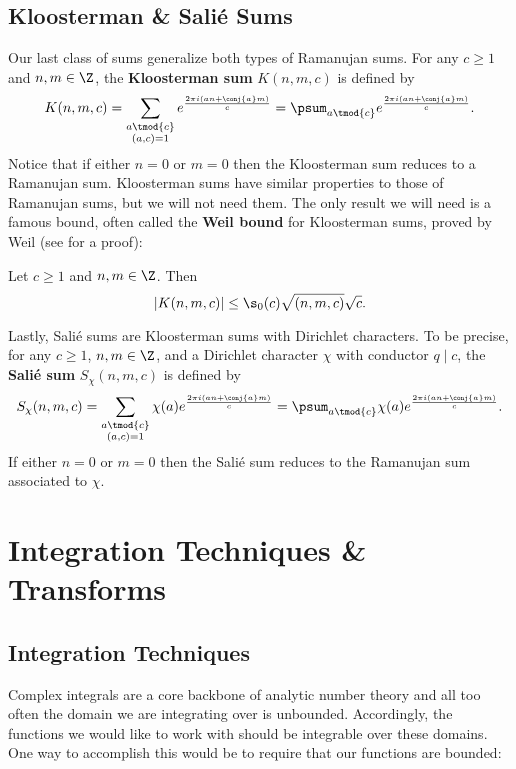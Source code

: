       \subsection*{Kloosterman \& Sali\'e Sums}
        Our last class of sums generalize both types of Ramanujan sums. For any $c \ge 1$ and $n,m \in \Z$, the \textbf{Kloosterman sum} $K(n,m,c)$ is defined by
        \[
          K(n,m,c) = \sum_{\substack{a \tmod{c} \\ (a,c) = 1}}e^{\frac{2\pi i(an+\conj{a}m)}{c}} = \psum_{a \tmod{c}}e^{\frac{2\pi i(an+\conj{a}m)}{c}}.
        \]
        Notice that if either $n = 0$ or $m = 0$ then the Kloosterman sum reduces to a Ramanujan sum. Kloosterman sums have similar properties to those of Ramanujan sums, but we will not need them. The only result we will need is a famous bound, often called the \textbf{Weil bound} for Kloosterman sums, proved by Weil (see \cite{weil1948some} for a proof):

        \begin{theorem}
          Let $c \ge 1$ and $n,m \in \Z$. Then
          \[
            |K(n,m,c)| \le \s_{0}(c)\sqrt{(n,m,c)}\sqrt{c}.
          \]
        \end{theorem}

        Lastly, Sali\'e sums are Kloosterman sums with Dirichlet characters. To be precise, for any $c \ge 1$, $n,m \in \Z$, and a Dirichlet character $\chi$ with conductor $q \mid c$, the \textbf{Sali\'e sum} $S_{\chi}(n,m,c)$ is defined by
        \[
          S_{\chi}(n,m,c) = \sum_{\substack{a \tmod{c} \\ (a,c) = 1}}\chi(a)e^{\frac{2\pi i(an+\conj{a}m)}{c}} = \psum_{a \tmod{c}}\chi(a)e^{\frac{2\pi i(an+\conj{a}m)}{c}}.
        \]
        If either $n = 0$ or $m = 0$ then the Sali\'e sum reduces to the Ramanujan sum associated to $\chi$.
    \section{Integration Techniques \& Transforms}
      \subsection*{Integration Techniques}
        Complex integrals are a core backbone of analytic number theory and all too often the domain we are integrating over is unbounded. Accordingly, the functions we would like to work with should be integrable over these domains. One way to accomplish this would be to require that our functions are bounded:

